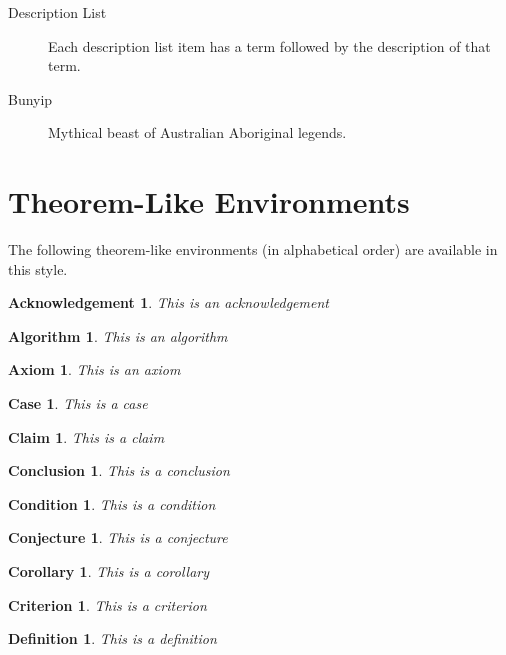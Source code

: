 \documentclass{amsbook}%
\theoremstyle{plain}
\newtheorem{acknowledgement}{Acknowledgement}
\newtheorem{algorithm}{Algorithm}
\newtheorem{axiom}{Axiom}
\newtheorem{case}{Case}
\newtheorem{claim}{Claim}
\newtheorem{conclusion}{Conclusion}
\newtheorem{condition}{Condition}
\newtheorem{conjecture}{Conjecture}
\newtheorem{corollary}{Corollary}
\newtheorem{criterion}{Criterion}
\newtheorem{definition}{Definition}
\numberwithin{equation}{section}
\begin{document}
\begin{description}
\item[Description List] Each description list item has a term
followed by the description of that term.

\item[Bunyip] Mythical beast of Australian Aboriginal legends.
\end{description}


\section{Theorem-Like Environments}

The following theorem-like environments (in alphabetical order) are available
in this style.

\begin{acknowledgement}
This is an acknowledgement
\end{acknowledgement}

\begin{algorithm}
This is an algorithm
\end{algorithm}

\begin{axiom}
This is an axiom
\end{axiom}

\begin{case}
This is a case
\end{case}

\begin{claim}
This is a claim
\end{claim}

\begin{conclusion}
This is a conclusion
\end{conclusion}

\begin{condition}
This is a condition
\end{condition}

\begin{conjecture}
This is a conjecture
\end{conjecture}

\begin{corollary}
This is a corollary
\end{corollary}

\begin{criterion}
This is a criterion
\end{criterion}

\begin{definition}
This is a definition
\end{definition}
\end{document}
